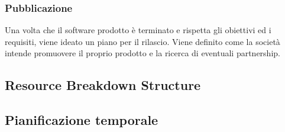  \subsubsection{Pubblicazione} 

Una volta che il software prodotto è terminato e rispetta gli obiettivi ed i requisiti, viene ideato un piano per il rilascio. Viene definito come la società intende promuovere il proprio prodotto e la ricerca di
eventuali partnership.




\subsection{Resource Breakdown Structure}


\subsection{Pianificazione temporale}

